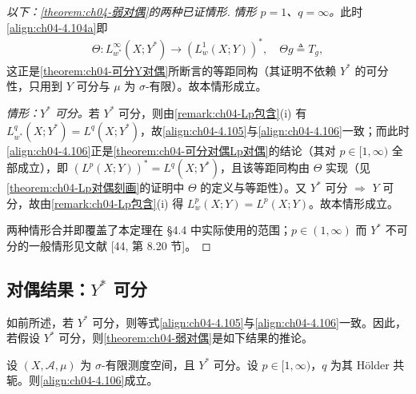 \documentclass[../../main.tex]{subfiles}%
\begin{document}
\begin{proof}[以下：\cref{theorem:ch04-弱对偶}的两种已证情形]
\emph{情形 $p=1$、$q=\infty$。}此时\eqref{align:ch04-4.104a}即
\begin{align*}
\Theta:L^\infty_{w^*}(X;Y^*)\to(L^1_w(X;Y))^*,\quad \Theta g\triangleq T_g,
\end{align*}
这正是\cref{theorem:ch04-可分Y对偶}所断言的等距同构（其证明不依赖 $Y^*$ 的可分性，只用到 $Y$ 可分与 $\mu$ 为 $\sigma$-有限）。故本情形成立。

\emph{情形：$Y^*$ 可分。}若 $Y^*$ 可分，则由\cref{remark:ch04-Lp包含}(i) 有 $L^q_{w^*}(X;Y^*)=L^q(X;Y^*)$，故\eqref{align:ch04-4.105}与\eqref{align:ch04-4.106}一致；而此时\eqref{align:ch04-4.106}正是\cref{theorem:ch04-可分对偶Lp对偶}的结论（其对 $p\in[1,\infty)$ 全部成立），即 $(L^p(X;Y))^*=L^q(X;Y^*)$，且该等距同构由 $\Theta$ 实现（见\cref{theorem:ch04-Lp对偶刻画}的证明中 $\Theta$ 的定义与等距性）。又 $Y^*$ 可分 $\Rightarrow$ $Y$ 可分，故由\cref{remark:ch04-Lp包含}(i) 得 $L^p_w(X;Y)=L^p(X;Y)$。故本情形成立。

两种情形合并即覆盖了本定理在 §4.4 中实际使用的范围；$p\in(1,\infty)$ 而 $Y^*$ 不可分的一般情形见文献 [44, 第 8.20 节]。
\end{proof}

\subsection{对偶结果：$Y^*$ 可分}\label{subsection:ch04-可分对偶对偶}

如前所述，若 $Y^*$ 可分，则等式\eqref{align:ch04-4.105}与\eqref{align:ch04-4.106}一致。因此，若假设 $Y^*$ 可分，则\cref{theorem:ch04-弱对偶}是如下结果的推论。

\begin{theorem}\label{theorem:ch04-可分对偶Lp对偶}
设 $(X,\mathcal{A},\mu)$ 为 $\sigma$-有限测度空间，且 $Y^*$ 可分。设 $p\in[1,\infty)$，$q$ 为其 Hölder 共轭。则\eqref{align:ch04-4.106}成立。
\end{theorem}
\end{document}
